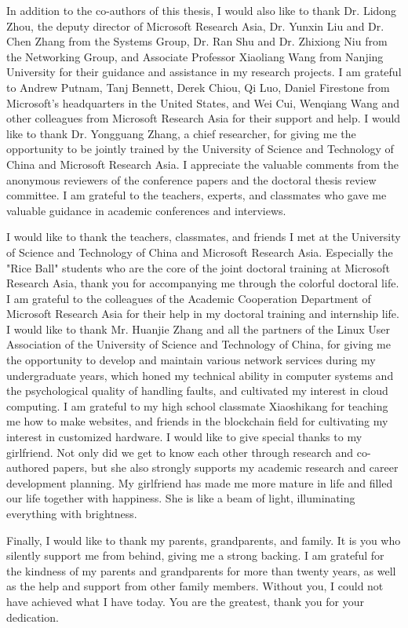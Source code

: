 \begin{acknowledgements}
In addition to the co-authors of this thesis, I would also like to thank Dr. Lidong Zhou, the deputy director of Microsoft Research Asia, Dr. Yunxin Liu and Dr. Chen Zhang from the Systems Group, Dr. Ran Shu and Dr. Zhixiong Niu from the Networking Group, and Associate Professor Xiaoliang Wang from Nanjing University for their guidance and assistance in my research projects. I am grateful to Andrew Putnam, Tanj Bennett, Derek Chiou, Qi Luo, Daniel Firestone from Microsoft's headquarters in the United States, and Wei Cui, Wenqiang Wang and other colleagues from Microsoft Research Asia for their support and help. I would like to thank Dr. Yongguang Zhang, a chief researcher, for giving me the opportunity to be jointly trained by the University of Science and Technology of China and Microsoft Research Asia. I appreciate the valuable comments from the anonymous reviewers of the conference papers and the doctoral thesis review committee. I am grateful to the teachers, experts, and classmates who gave me valuable guidance in academic conferences and interviews.

I would like to thank the teachers, classmates, and friends I met at the University of Science and Technology of China and Microsoft Research Asia. Especially the "Rice Ball" students who are the core of the joint doctoral training at Microsoft Research Asia, thank you for accompanying me through the colorful doctoral life. I am grateful to the colleagues of the Academic Cooperation Department of Microsoft Research Asia for their help in my doctoral training and internship life. I would like to thank Mr. Huanjie Zhang and all the partners of the Linux User Association of the University of Science and Technology of China, for giving me the opportunity to develop and maintain various network services during my undergraduate years, which honed my technical ability in computer systems and the psychological quality of handling faults, and cultivated my interest in cloud computing. I am grateful to my high school classmate Xiaoshikang for teaching me how to make websites, and friends in the blockchain field for cultivating my interest in customized hardware. I would like to give special thanks to my girlfriend. Not only did we get to know each other through research and co-authored papers, but she also strongly supports my academic research and career development planning. My girlfriend has made me more mature in life and filled our life together with happiness. She is like a beam of light, illuminating everything with brightness.

Finally, I would like to thank my parents, grandparents, and family. It is you who silently support me from behind, giving me a strong backing. I am grateful for the kindness of my parents and grandparents for more than twenty years, as well as the help and support from other family members. Without you, I could not have achieved what I have today. You are the greatest, thank you for your dedication.
\end{acknowledgements}
